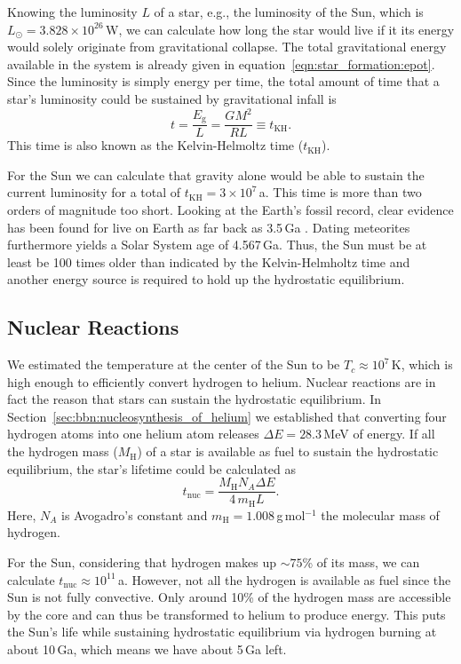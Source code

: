 Knowing the luminosity $L$ of a star, e.g., the luminosity of the Sun, which is $L_\odot = 3.828\times10^{26}$\,W, we can calculate how long the star would live if it its energy would solely originate from gravitational collapse. The total gravitational energy available in the system is already given in equation~\eqref{eqn:star_formation:epot}. Since the luminosity is simply energy per time, the total amount of time that a star's luminosity could be sustained by gravitational infall is
\begin{equation}
    t = \frac{E_\mathrm{g}}{L} = \frac{GM^2}{RL} \equiv t_\mathrm{KH}.
    \label{eqn:star_formation:kelvin_helmholtz_time}
\end{equation}
This time is also known as the Kelvin-Helmoltz time ($t_\mathrm{KH}$). 

For the Sun we can calculate that gravity alone would be able to sustain the current luminosity for a total of $t_\mathrm{KH} = 3\times10^{7}$\,a. This time is more than two orders of magnitude too short. Looking at the Earth's fossil record, clear evidence has been found for live on Earth as far back as 3.5\,Ga \citep{schopf07}. Dating meteorites furthermore yields a Solar System age of 4.567\,Ga. Thus, the Sun must be at least be 100 times older than indicated by the Kelvin-Helmholtz time and another energy source is required to hold up the hydrostatic equilibrium.


\subsection{Nuclear Reactions}

We estimated the temperature at the center of the Sun to be $T_c \approx 10^7$\,K, which is high enough to efficiently convert hydrogen to helium. Nuclear reactions are in fact the reason that stars can sustain the hydrostatic equilibrium. In Section~\ref{sec:bbn:nucleosynthesis_of_helium} we established that converting four hydrogen atoms into one helium atom releases $\Delta E = 28.3$\,MeV of energy. If all the hydrogen mass ($M_\mathrm{H}$) of a star is available as fuel to sustain the hydrostatic equilibrium, the star's lifetime could be calculated as
\begin{equation}
    t_\mathrm{nuc} = \frac{M_\mathrm{H} N_A \Delta E}{4\,m_\mathrm{H} L}.
\end{equation}
Here, $N_A$ is Avogadro's constant and $m_\mathrm{H} = 1.008\,$g\,mol$^{-1}$ the molecular mass of hydrogen.

For the Sun, considering that hydrogen makes up $\sim75$\% of its mass, we can calculate $t_\mathrm{nuc} \approx 10^{11}$\,a. However, not all the hydrogen is available as fuel since the Sun is not fully convective. Only around 10\% of the hydrogen mass are accessible by the core and can thus be transformed to helium to produce energy. This puts the Sun's life while sustaining hydrostatic equilibrium via hydrogen burning at about 10\,Ga, which means we have about 5\,Ga left.


